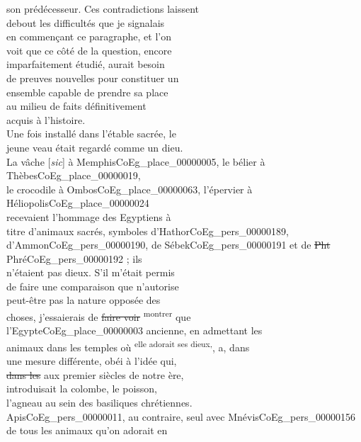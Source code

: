 \documentclass{book}
\begin{document}
{\begin{paracol}{2}
son prédécesseur. Ces contradictions laissent\\
debout les difficultés que je signalais\\
en commençant ce paragraphe, et l’on\\
voit que ce côté de la question, encore\\
imparfaitement étudié, aurait besoin\\
de preuves nouvelles pour constituer un\\
ensemble capable de prendre sa place\\
au milieu de faits définitivement\\
acquis à l’histoire.\\
\noindent Une fois installé dans l’étable sacrée, le\\
jeune veau était regardé comme un dieu.\\
La vâche [\textit{sic}] à Memphis\gls{CoEg_place_00000005}, le bélier à Thèbes\gls{CoEg_place_00000019},\\
le crocodile à Ombos\gls{CoEg_place_00000063}, l’épervier à Héliopolis\gls{CoEg_place_00000024}\\
recevaient l’hommage des Egyptiens à\\
titre d’animaux sacrés, symboles d’Hathor\gls{CoEg_pers_00000189},\\
d’Ammon\gls{CoEg_pers_00000190}, de Sébek\gls{CoEg_pers_00000191} et de \sout{Pht} Phré\gls{CoEg_pers_00000192} ; ils\\
n’étaient pas dieux. S’il m’était permis\\
de faire une comparaison que n’autorise\\
peut-être pas la nature opposée des\\
choses, j’essaierais de \sout{faire voir} \textsuperscript{montrer} que\\
l’Egypte\gls{CoEg_place_00000003} ancienne, en admettant les\\
animaux dans les temples où \textsuperscript{elle adorait ses dieux,}, a, dans\\
une mesure différente, obéi à l’idée qui,\\
\sout{dans les} aux premier siècles de notre ère,\\
introduisait la colombe, le poisson,\\
l’agneau au sein des basiliques chrétiennes.\\
Apis\gls{CoEg_pers_00000011}, au contraire, seul avec Mnévis\gls{CoEg_pers_00000156}\\
de tous les animaux qu’on adorait en\\

\end{paracol}}
\end{document}

